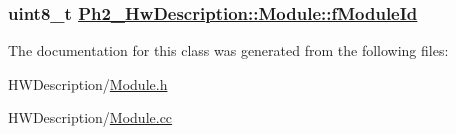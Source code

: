\hypertarget{class_ph2___hw_description_1_1_module_8bf42ae708d304acbc5509edf7f7cee0}{
\subsubsection[fModuleId]{\setlength{\rightskip}{0pt plus 5cm}uint8\_\-t \hyperlink{class_ph2___hw_description_1_1_module_8bf42ae708d304acbc5509edf7f7cee0}{Ph2\_\-Hw\-Description::Module::f\-Module\-Id}}}
\label{class_ph2___hw_description_1_1_module_8bf42ae708d304acbc5509edf7f7cee0}




The documentation for this class was generated from the following files:\begin{CompactItemize}
\item 
HWDescription/\hyperlink{_module_8h}{Module.h}\item 
HWDescription/\hyperlink{_module_8cc}{Module.cc}\end{CompactItemize}

